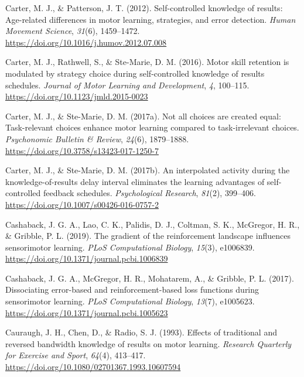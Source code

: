 \documentclass[
  doc, donotrepeattitle,floatsintext]{apa7}
\newlength{\cslhangindent}
\newlength{\cslentryspacingunit} %
\newenvironment{CSLReferences}[2] %
 {%
  \setlength{\parindent}{0pt}
  \ifodd #1
  \let\oldpar\par
  \def\par{\hangindent=\cslhangindent\oldpar}
  \fi
  \setlength{\parskip}{#2\cslentryspacingunit}
 }%
 {}
\begin{document}
\begin{CSLReferences}{1}{0}
\leavevmode{}%
Carter, M. J., \& Patterson, J. T. (2012). Self-controlled knowledge of results: {Age-related} differences in motor learning, strategies, and error detection. \emph{Human Movement Science}, \emph{31}(6), 1459--1472. \url{https://doi.org/10.1016/j.humov.2012.07.008}

\leavevmode{}%
Carter, M. J., Rathwell, S., \& Ste-Marie, D. M. (2016). Motor skill retention is modulated by strategy choice during self-controlled knowledge of results schedules. \emph{Journal of Motor Learning and Development}, \emph{4}, 100--115. \url{https://doi.org/10.1123/jmld.2015-0023}

\leavevmode{}%
Carter, M. J., \& Ste-Marie, D. M. (2017a). Not all choices are created equal: {Task}-relevant choices enhance motor learning compared to task-irrelevant choices. \emph{Psychonomic Bulletin \& Review}, \emph{24}(6), 1879--1888. \url{https://doi.org/10.3758/s13423-017-1250-7}

\leavevmode{}%
Carter, M. J., \& Ste-Marie, D. M. (2017b). An interpolated activity during the knowledge-of-results delay interval eliminates the learning advantages of self-controlled feedback schedules. \emph{Psychological Research}, \emph{81}(2), 399--406. \url{https://doi.org/10.1007/s00426-016-0757-2}

\leavevmode{}%
Cashaback, J. G. A., Lao, C. K., Palidis, D. J., Coltman, S. K., McGregor, H. R., \& Gribble, P. L. (2019). The gradient of the reinforcement landscape influences sensorimotor learning. \emph{PLoS Computational Biology}, \emph{15}(3), e1006839. \url{https://doi.org/10.1371/journal.pcbi.1006839}

\leavevmode{}%
Cashaback, J. G. A., McGregor, H. R., Mohatarem, A., \& Gribble, P. L. (2017). Dissociating error-based and reinforcement-based loss functions during sensorimotor learning. \emph{PLoS Computational Biology}, \emph{13}(7), e1005623. \url{https://doi.org/10.1371/journal.pcbi.1005623}

\leavevmode{}%
Cauraugh, J. H., Chen, D., \& Radio, S. J. (1993). Effects of traditional and reversed bandwidth knowledge of results on motor learning. \emph{Research Quarterly for Exercise and Sport}, \emph{64}(4), 413--417. \url{https://doi.org/10.1080/02701367.1993.10607594}


\end{CSLReferences}
\end{document}
